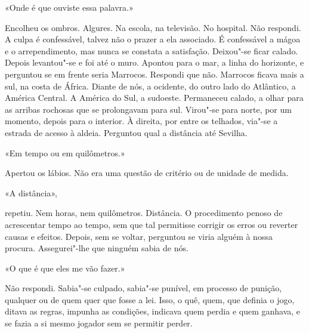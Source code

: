 «Onde é que ouviste essa palavra.»

Encolheu os ombros. Algures. Na escola, na televisão. No hospital. Não
respondi. A culpa é confessável, talvez não o prazer a ela associado. É
confessável a mágoa e o arrependimento, mas nunca se constata a
satisfação. Deixou"-se ficar calado. Depois levantou"-se e foi até o
muro. Apontou para o mar, a linha do horizonte, e perguntou se em frente
seria Marrocos. Respondi que não. Marrocos ficava mais a sul, na costa
de África. Diante de nós, a ocidente, do outro lado do Atlântico, a
América Central. A América do Sul, a sudoeste. Permaneceu calado, a
olhar para as arribas rochosas que se prolongavam para sul. Virou"-se
para norte, por um momento, depois para o interior. À direita, por entre
os telhados, via"-se a estrada de acesso à aldeia. Perguntou qual a
distância até Sevilha.

«Em tempo ou em quilômetros.»

Apertou os lábios. Não era uma questão de critério ou de unidade de
medida.

«A distância»,

repetiu. Nem horas, nem quilômetros. Distância. O procedimento penoso de
acrescentar tempo ao tempo, sem que tal permitisse corrigir os erros ou
reverter causas e efeitos. Depois, sem se voltar, perguntou se viria
alguém à nossa procura. Assegurei"-lhe que ninguém sabia de nós.

«O que é que eles me vão fazer.»

Não respondi. Sabia"-se culpado, sabia"-se punível, em processo de
punição, qualquer ou de quem quer que fosse a lei. Isso, o quê, quem,
que definia o jogo, ditava as regras, impunha as condições, indicava
quem perdia e quem ganhava, e se fazia a si mesmo jogador sem se
permitir perder.

